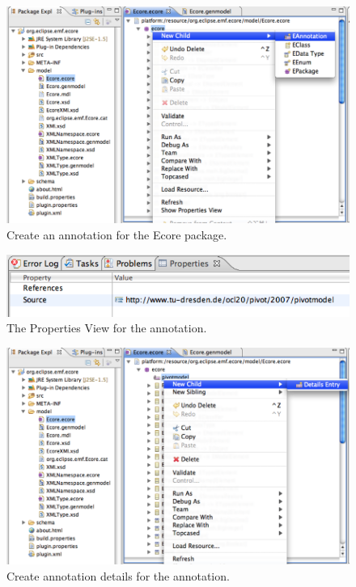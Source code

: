 \begin{figure}[!htbp]
	\centering
	\includegraphics[width=1.0\linewidth]{figures/pivotModelAdaption/CreateAnnotation}
	\caption{Create an annotation for the Ecore package.}
	\label{pic:pivotModelAdaption:CreateAnnotation}
\end{figure}

\begin{figure}[!htbp]
	\centering
	\includegraphics[width=1.0\linewidth]{figures/pivotModelAdaption/AnnotationProperties}
	\caption{The Properties View for the annotation.}
	\label{pic:pivotModelAdaption:AnnotationProperties}
\end{figure}

\begin{figure}[!htbp]
	\centering
	\includegraphics[width=1.0\linewidth]{figures/pivotModelAdaption/CreateAnnotationDetails}
	\caption{Create annotation details for the annotation.}
	\label{pic:pivotModelAdaption:CreateAnnotationDetails}
\end{figure}


